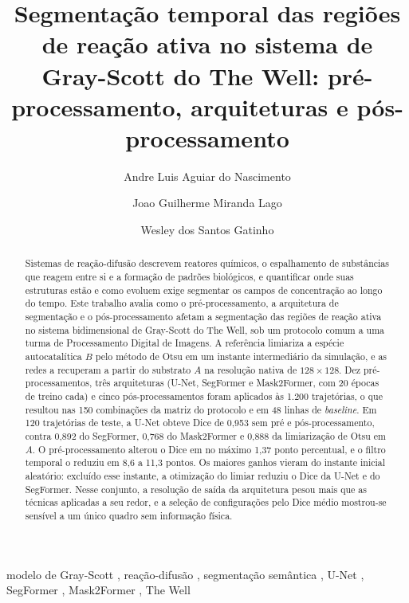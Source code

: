 \documentclass[final,5p,times,twocolumn]{elsarticle}
\begin{document}
\begin{frontmatter}

\title{Segmentação temporal das regiões de reação ativa no sistema de Gray-Scott do The Well: pré-processamento, arquiteturas e pós-processamento}

\author[a]{Andre Luis Aguiar do Nascimento}

\author[a]{Joao Guilherme Miranda Lago}

\author[a]{Wesley dos Santos Gatinho}


\begin{abstract}
Sistemas de reação-difusão descrevem reatores químicos, o espalhamento de substâncias que reagem entre si e a formação de padrões biológicos, e quantificar onde suas estruturas estão e como evoluem exige segmentar os campos de concentração ao longo do tempo. Este trabalho avalia como o pré-processamento, a arquitetura de segmentação e o pós-processamento afetam a segmentação das regiões de reação ativa no sistema bidimensional de Gray-Scott do The Well, sob um protocolo comum a uma turma de Processamento Digital de Imagens. A referência limiariza a espécie autocatalítica $B$ pelo método de Otsu em um instante intermediário da simulação, e as redes a recuperam a partir do substrato $A$ na resolução nativa de $128\times128$. Dez pré-processamentos, três arquiteturas (U-Net, SegFormer e Mask2Former, com 20 épocas de treino cada) e cinco pós-processamentos foram aplicados às 1.200 trajetórias, o que resultou nas 150 combinações da matriz do protocolo e em 48 linhas de \textit{baseline}. Em 120 trajetórias de teste, a U-Net obteve Dice de 0,953 sem pré e pós-processamento, contra 0,892 do SegFormer, 0,768 do Mask2Former e 0,888 da limiarização de Otsu em $A$. O pré-processamento alterou o Dice em no máximo 1,37 ponto percentual, e o filtro temporal o reduziu em 8,6 a 11,3 pontos. Os maiores ganhos vieram do instante inicial aleatório: excluído esse instante, a otimização do limiar reduziu o Dice da U-Net e do SegFormer. Nesse conjunto, a resolução de saída da arquitetura pesou mais que as técnicas aplicadas a seu redor, e a seleção de configurações pelo Dice médio mostrou-se sensível a um único quadro sem informação física.
\end{abstract}

\begin{keyword}
modelo de Gray-Scott \sep
reação-difusão \sep
segmentação semântica \sep
U-Net \sep
SegFormer \sep
Mask2Former \sep
The Well
\end{keyword}

\end{frontmatter}
\end{document}
